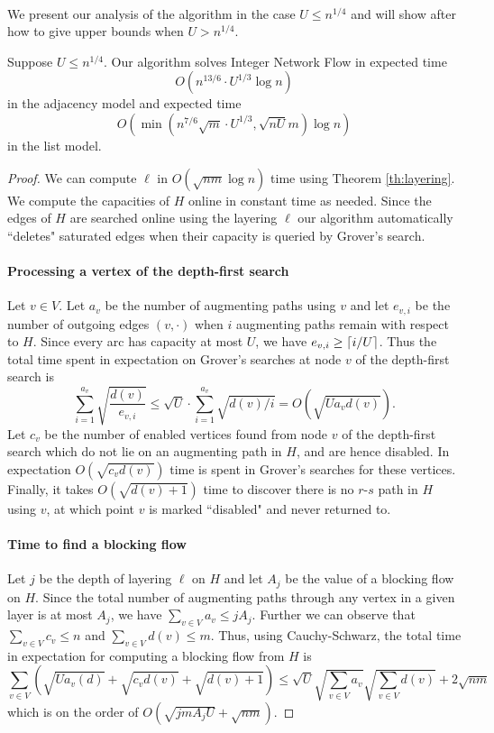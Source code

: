 \paragraph{}
We present our analysis of the algorithm in the case $U\leq n^{1/4}$ and will show after how to give upper bounds when $U > n^{1/4}$.
\begin{theorem}
Suppose $U \leq n^{1/4}$. Our algorithm solves Integer Network Flow in expected time $$O(n^{13/6}\cdot U^{1/3}\log n)$$ in the adjacency model and expected time $$O(\min(n^{7/6}\sqrt{m}\cdot U^{1/3}, \sqrt{nU}m)\log n)$$ in the list model.
\end{theorem}
\begin{proof}
We can compute $\ell$ in $O(\sqrt{nm}\log n)$ time using Theorem \ref{th:layering}. We compute the capacities of $H$ online in constant time as needed. Since the edges of $H$ are searched online using the layering $\ell$ our algorithm automatically ``deletes" saturated edges when their capacity is queried by Grover's search.
\paragraph{Processing a vertex of the depth-first search}
Let $v \in V$.  Let $a_v$ be the number of augmenting paths using $v$ and let $e_{v,i}$ be the number of outgoing edges $(v,\cdot)$ when $i$ augmenting paths remain with respect to $H$. Since every arc has capacity at most $U$, we have $e_{v,i} \geq \left\lceil i/U\right\rceil$. Thus the total time spent in expectation on Grover's searches at node $v$ of the depth-first search is
$$\sum_{i=1}^{a_v} \sqrt{\frac{d(v)}{e_{v,i}}} \leq \sqrt{U}\cdot\sum_{i=1}^{a_v}\sqrt{d(v)/i} = O(\sqrt{Ua_vd(v)}).$$
Let $c_v$ be the number of enabled vertices found from node $v$ of the depth-first search which do not lie on an augmenting path in $H$, and are hence disabled. In expectation $O(\sqrt{c_vd(v)})$ time is spent in Grover's searches for these vertices. Finally, it takes $O(\sqrt{d(v) + 1})$ time to discover there is no $r$-$s$ path in $H$ using $v$, at which point $v$ is marked ``disabled" and never returned to.
\paragraph{Time to find a blocking flow}
Let $j$ be the depth of layering $\ell$ on $H$ and let $A_j$ be the value of a blocking flow on $H$. Since the total number of augmenting paths through any vertex in a given layer is at most $A_j$, we have $\sum_{v \in V} a_v \leq jA_j$. Further we can observe that $\sum_{v \in V} c_v \leq n$ and $\sum_{v \in V} d(v) \leq m$.  Thus, using Cauchy-Schwarz, the total time in expectation for computing a blocking flow from $H$ is
$$\sum_{v \in V}(\sqrt{Ua_v(d)} + \sqrt{c_vd(v)} + \sqrt{d(v)+1}) \leq \sqrt{U}\sqrt{\sum_{v\in V}a_v}\sqrt{\sum_{v\in V} d(v)} + 2\sqrt{nm}$$
which is on the order of $O(\sqrt{jmA_jU} + \sqrt{nm})$.

\end{proof}
